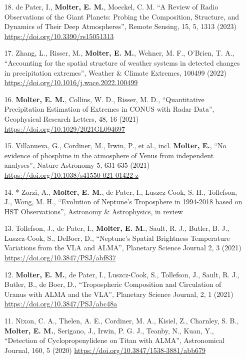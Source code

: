 \documentclass[margin, 10pt]{res} %
\begin{document}
\begin{resume}
{\begin{enumerate}
\item[18.] de Pater, I., {\bf Molter, E. M.}, Moeckel, C. M. ``A Review of Radio Observations of the Giant Planets: Probing the Composition, Structure, and Dynamics of Their Deep Atmospheres'', Remote Sensing, 15, 5, 1313 (2023) \url{https://doi.org/10.3390/rs15051313}
	
\item[17.] Zhang, L., Risser, M., {\bf Molter, E. M.}, Wehner, M. F., O'Brien, T. A., ``Accounting for the spatial structure of weather systems in detected changes in precipitation extremes'', Weather \& Climate Extremes, 100499 (2022) \url{https://doi.org/10.1016/j.wace.2022.100499}

\item[16.] {\bf Molter, E. M.}, Collins, W. D., Risser, M. D., ``Quantitative Precipitation Estimation of Extremes in CONUS with Radar Data'', Geophysical Research Letters, 48, 16 (2021) \url{https://doi.org/10.1029/2021GL094697}

\item[15.] Villanueva, G., Cordiner, M., Irwin, P., et al., incl. {\bf Molter, E.}, ``No evidence of phosphine in the atmosphere of Venus from independent analyses'', Nature Astronomy 5, 631-635 (2021) \url{https://doi.org/10.1038/s41550-021-01422-z}

\item[14.]* Zorzi, A., {\bf Molter, E. M.}, de Pater, I., Luszcz-Cook, S. H., Tollefson, J., Wong, M. H., ``Evolution of Neptune's Troposphere in 1994-2018 based on HST Observations'', Astronomy \& Astrophysics, in review 

\item[13.] Tollefson, J., de Pater, I., {\bf Molter, E. M.}, Sault, R. J., Butler, B. J., Luszcz-Cook, S., DeBoer, D., ``Neptune's Spatial Brightness Temperature Variations from the VLA and ALMA'', Planetary Science Journal 2, 3 (2021) \url{https://doi.org/10.3847/PSJ/abf837}

\item[12.] {\bf Molter, E. M.}, de Pater, I., Luszcz-Cook, S., Tollefson, J., Sault, R. J., Butler, B., de Boer, D., ``Tropospheric Composition and Circulation of Uranus with ALMA and the VLA'', Planetary Science Journal, 2, 1 (2021) \url{https://doi.org/10.3847/PSJ/abc48a}

\item[11.] Nixon, C. A., Thelen, A. E., Cordiner, M. A., Kisiel, Z., Charnley, S. B., {\bf Molter, E. M.}, Serigano, J., Irwin, P. G. J., Teanby, N., Kuan, Y., ``Detection of Cyclopropenylidene on Titan with ALMA'', Astronomical Journal, 160, 5 (2020) \url{https://doi.org/10.3847/1538-3881/abb679}


\end{enumerate}}
\end{resume}
\end{document}
